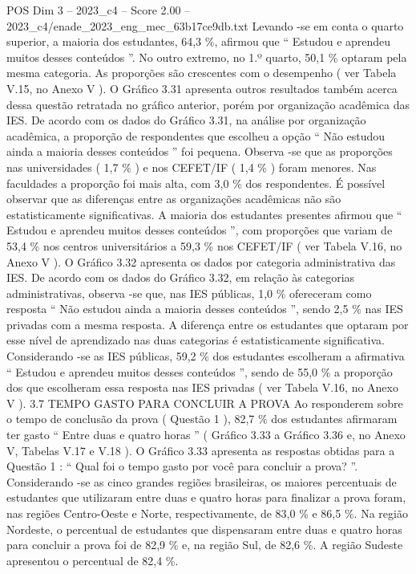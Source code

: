 \begin{textsample}{POS Dim 3 – 2023\_c4 – Score 2.00 – 2023\_c4/enade\_2023\_eng\_mec\_63b17ce9db.txt}
Levando -se em conta o quarto superior, a maioria dos estudantes, 64,3 \%, afirmou que “ Estudou e aprendeu muitos desses conteúdos ”.
No outro extremo, no 1.º quarto, 50,1 \% optaram pela mesma categoria.
As proporções são crescentes com o desempenho ( ver Tabela V.15, no Anexo V ).
O Gráfico 3.31 apresenta outros resultados também acerca dessa questão retratada no gráfico anterior, porém por organização acadêmica das IES.
De acordo com os dados do Gráfico 3.31, na análise por organização acadêmica, a proporção de respondentes que escolheu a opção “ Não estudou ainda a maioria desses conteúdos ” foi pequena.
Observa -se que as proporções nas universidades ( 1,7 \% ) e nos CEFET/IF ( 1,4 \% ) foram menores.
Nas faculdades a proporção foi mais alta, com 3,0 \% dos respondentes.
É possível observar que as diferenças entre as organizações acadêmicas não são estatisticamente significativas.
A maioria dos estudantes presentes afirmou que “ Estudou e aprendeu muitos desses conteúdos ”, com proporções que variam de 53,4 \% nos centros universitários a 59,3 \% nos CEFET/IF ( ver Tabela V.16, no Anexo V ).
O Gráfico 3.32 apresenta os dados por categoria administrativa das IES.
De acordo com os dados do Gráfico 3.32, em relação às categorias administrativas, observa -se que, nas IES públicas, 1,0 \% ofereceram como resposta “ Não estudou ainda a maioria desses conteúdos ”, sendo 2,5 \% nas IES privadas com a mesma resposta.
A diferença entre os estudantes que optaram por esse nível de aprendizado nas duas categorias é estatisticamente significativa.
Considerando -se as IES públicas, 59,2 \% dos estudantes escolheram a afirmativa “ Estudou e aprendeu muitos desses conteúdos ”, sendo de 55,0 \% a proporção dos que escolheram essa resposta nas IES privadas ( ver Tabela V.16, no Anexo V ). 3.7 TEMPO GASTO PARA CONCLUIR A PROVA Ao responderem sobre o tempo de conclusão da prova ( Questão 1 ), 82,7 \% dos estudantes afirmaram ter gasto “ Entre duas e quatro horas ” ( Gráfico 3.33 a Gráfico 3.36 e, no Anexo V, Tabelas V.17 e V.18 ).
O Gráfico 3.33 apresenta as respostas obtidas para a Questão 1 : “ Qual foi o tempo gasto por você para concluir a prova? ”.
Considerando -se as cinco grandes regiões brasileiras, os maiores percentuais de estudantes que utilizaram entre duas e quatro horas para finalizar a prova foram, nas regiões Centro-Oeste e Norte, respectivamente, de 83,0 \% e 86,5 \%.
Na região Nordeste, o percentual de estudantes que dispensaram entre duas e quatro horas para concluir a prova foi de 82,9 \% e, na região Sul, de 82,6 \%.
A região Sudeste apresentou o percentual de 82,4 \%.

\end{textsample}
